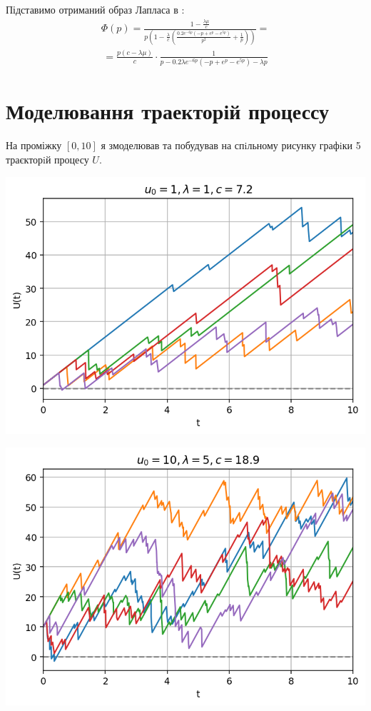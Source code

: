 \documentclass{article}
\begin{document}
    Підставимо отриманий образ Лапласа в :
    \begin{gather}
        \Phi(p) = \frac{1 - \frac{\lambda \mu}{c}}{p\left(1 - \frac{\lambda}{c}
            \left(
                \frac{0.2e^{-6p}(-p + e^p - e^{5p})}{p^2} + \frac{1}{p}
            \right)
        \right)} = 
    \end{gather}
    \begin{gather*}
        = \frac{p(c - \lambda\mu)}{c}\cdot\frac{1}{
            p - 0.2 \lambda e^{-6p} (-p + e^p - e^{5p}) - \lambda p
        }
    \end{gather*}
    \section{Моделювання траекторій процессу}
    На проміжку $[0, 10]$ я змоделював та 
    побудував на спiльному рисунку графiки 5 траєкторiй процесу $U$.


    \includegraphics{traj_1.png}


    \includegraphics{traj_2.png}
\end{document}

